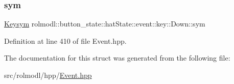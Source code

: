\subsubsection{\texorpdfstring{sym}{sym}}
{\footnotesize\ttfamily \mbox{\hyperlink{structrolmodl_1_1button__state_1_1_keysym}{Keysym}} rolmodl\+::button\+\_\+state\+::hat\+State\+::event\+::key\+::\+Down\+::sym}



Definition at line 410 of file Event.\+hpp.



The documentation for this struct was generated from the following file\+:\begin{DoxyCompactItemize}
\item 
src/rolmodl/hpp/\mbox{\hyperlink{_event_8hpp}{Event.\+hpp}}\end{DoxyCompactItemize}

